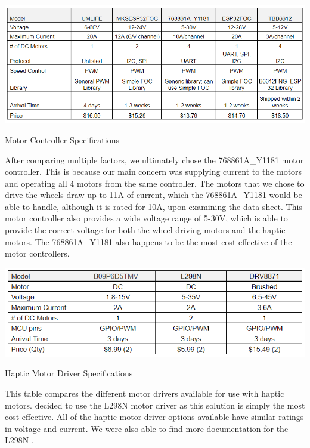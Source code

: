 \begin{table}[H]
	\centering
	\includegraphics[width=1\textwidth]{./Images/motor_controller_table2.png}
	\caption{\label{fig:motor_controller}Motor Controller Specifications}
\end{table}

\noindent After comparing multiple factors, we ultimately chose the 768861A\_Y1181 motor controller. This is because our main concern was supplying current to the motors and operating all 4 motors from the same controller. The motors that we chose to drive the wheels draw up to 11A of current, which the 768861A\_Y1181 would be able to handle, although it is rated for 10A, upon examining the data sheet. This motor controller also provides a wide voltage range of 5-30V, which is able to provide the correct voltage for both the wheel-driving motors and the haptic motors. The 768861A\_Y1181 also happens to be the most cost-effective of the motor controllers. \cite{UMLIFE} \cite{AliExpress5} \cite{Makerbase} \cite{AliExpress7} \cite{CircuitBasics} \cite{Espressif1} \cite{AliExpress4} \cite{Burgess} \cite{RandomNerd} \cite{Espressif2} \cite{SimpleFOC} \cite{SimpleFOC2} \cite{Peza}\\


\begin{table}[H]
	\centering
	\includegraphics[width=1\textwidth]{./Images/haptic_driver_table_2.png}
	\caption{\label{fig:haptic_driver}Haptic Motor Driver Specifications}
\end{table}

\noindent This table compares the different motor drivers available for use with haptic motors.  decided to use the L298N motor driver as this solution is simply the most cost-effective. All of the haptic motor driver options available have similar ratings in voltage and current. We were also able to find more documentation for the L298N \cite{BOJACK} \cite{BEEYDC} \cite{HiLetgo}.\\

